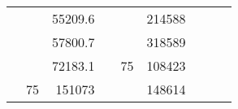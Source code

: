 \begin{table}[H]
\begin{tabular}{|ccrccrccc}
\multicolumn{1}{|c|}{\cellcolor[HTML]{FFFFC7}}                                & \multicolumn{1}{c|}{\cellcolor[HTML]{DAE8FC}}                      & \multicolumn{1}{r|}{\cellcolor[HTML]{DAE8FC}55209.6}   & \multicolumn{1}{c|}{\cellcolor[HTML]{FFFFC7}}                                & \multicolumn{1}{c|}{\cellcolor[HTML]{DAE8FC}}                       & \multicolumn{1}{r|}{\cellcolor[HTML]{DDFDFF}214588}    &                                                                              &                                                                    &                                                        \\ \cline{3-3} \cline{6-6}
\multicolumn{1}{|c|}{\cellcolor[HTML]{FFFFC7}}                                & \multicolumn{1}{c|}{\cellcolor[HTML]{DAE8FC}}                      & \multicolumn{1}{r|}{\cellcolor[HTML]{DDFDFF}57800.7}   & \multicolumn{1}{c|}{\cellcolor[HTML]{FFFFC7}}                                & \multicolumn{1}{c|}{\cellcolor[HTML]{DAE8FC}}                       & \multicolumn{1}{r|}{\cellcolor[HTML]{DAE8FC}318589}    &                                                                              &                                                                    &                                                        \\ \cline{3-3} \cline{6-6}
\multicolumn{1}{|c|}{\cellcolor[HTML]{FFFFC7}}                                & \multicolumn{1}{c|}{\cellcolor[HTML]{DAE8FC}}                      & \multicolumn{1}{r|}{\cellcolor[HTML]{DAE8FC}72183.1}   & \multicolumn{1}{c|}{\cellcolor[HTML]{FFFFC7}}                                & \multicolumn{1}{c|}{\multirow{-10}{*}{\cellcolor[HTML]{DAE8FC}75}}  & \multicolumn{1}{r|}{\cellcolor[HTML]{DDFDFF}108423}    &                                                                              &                                                                    &                                                        \\ \cline{3-3} \cline{5-6}
\multicolumn{1}{|c|}{\cellcolor[HTML]{FFFFC7}}                                & \multicolumn{1}{c|}{\multirow{-10}{*}{\cellcolor[HTML]{DAE8FC}75}} & \multicolumn{1}{r|}{\cellcolor[HTML]{DDFDFF}151073}    & \multicolumn{1}{c|}{\cellcolor[HTML]{FFFFC7}}                                & \multicolumn{1}{c|}{\cellcolor[HTML]{DDFDFF}}                       & \multicolumn{1}{r|}{\cellcolor[HTML]{DAE8FC}148614}    &                                                                              &                                                                    &                                                        \\ \cline{2-3} \cline{6-6}

\end{tabular}
\end{table}
